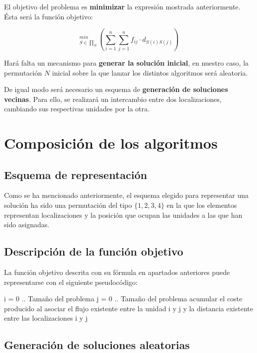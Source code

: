 \documentclass[twoside]{article}
\begin{document}
El objetivo del problema es \textbf{minimizar} la expresión mostrada anteriormente. Ésta será la función objetivo:

\begin{displaymath}
_{S\in\prod _N}^{min}\left ( \sum_{i=1}^n \sum_{j=1}^n f_{ij} \cdot d_{S(i)S(j)}  \right )
\end{displaymath}

Hará falta un mecanismo para \textbf{generar la solución inicial}, en nuestro caso, la permutación $N$ inicial sobre la que lanzar los distintos algoritmos será aleatoria.

De igual modo será necesario un esquema de \textbf{generación de soluciones vecinas}. Para ello, se realizará un intercambio entre dos localizaciones, cambiando sus respectivas unidades por la otra.

\section{Composición de los algoritmos}

\subsection{Esquema de representación}

Como se ha mencionado anteriormente, el esquema elegido para representar
una solución ha sido una permutación del tipo $\{1,2,3,4\}$ en la que los
elementos representan localizaciones y la posición que ocupan las unidades
a las que han sido asignadas.

\subsection{Descripción de la función objetivo}

La función objetivo descrita con su fórmula en apartados anteriores puede
representarse con el siguiente pseudocódigo:

\begin{pythoncode}
i = 0 .. Tamaño del problema
    j = 0 .. Tamaño del problema
        acumular el coste producido al asociar el flujo existente entre
        la unidad i y j y la distancia existente entre las localizaciones
        i y j
\end{pythoncode}

\subsection{Generación de soluciones aleatorias}
\end{document}
